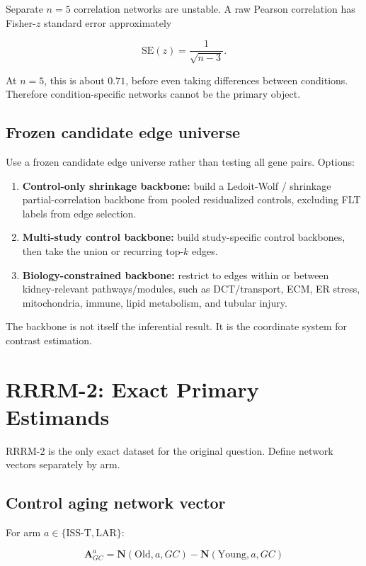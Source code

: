 \documentclass[11pt]{article}
\begin{document}
Separate $n=5$ correlation networks are unstable. A raw Pearson correlation has
Fisher-$z$ standard error approximately

\[
\mathrm{SE}(z) = \frac{1}{\sqrt{n-3}}.
\]

At $n=5$, this is about $0.71$, before even taking differences between
conditions. Therefore condition-specific networks cannot be the primary object.

\subsection{Frozen candidate edge universe}

Use a frozen candidate edge universe rather than testing all gene pairs. Options:

\begin{enumerate}
  \item \textbf{Control-only shrinkage backbone:} build a Ledoit-Wolf / shrinkage
  partial-correlation backbone from pooled residualized controls, excluding FLT
  labels from edge selection.
  \item \textbf{Multi-study control backbone:} build study-specific control
  backbones, then take the union or recurring top-$k$ edges.
  \item \textbf{Biology-constrained backbone:} restrict to edges within or
  between kidney-relevant pathways/modules, such as DCT/transport, ECM, ER
  stress, mitochondria, immune, lipid metabolism, and tubular injury.
\end{enumerate}

The backbone is not itself the inferential result. It is the coordinate system
for contrast estimation.

\section{RRRM-2: Exact Primary Estimands}

RRRM-2 is the only exact dataset for the original question. Define network
vectors separately by arm.

\subsection{Control aging network vector}

For arm $a \in \{\mathrm{ISS\mbox{-}T}, \mathrm{LAR}\}$:

\[
\mathbf{A}^{a}_{GC}
= \mathbf{N}(\mathrm{Old}, a, GC)
- \mathbf{N}(\mathrm{Young}, a, GC)
\]
\end{document}
